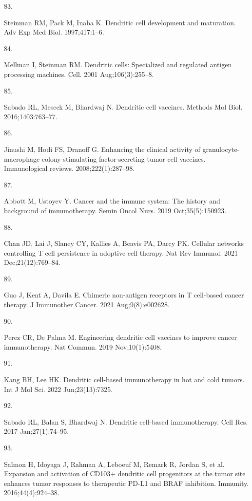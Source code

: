 \documentclass[
]{article}
\newlength{\cslhangindent}
\newlength{\csllabelwidth}
\newenvironment{CSLReferences}[2] %
 {\begin{list}{}{%
  \setlength{\itemindent}{0pt}
  \setlength{\leftmargin}{0pt}
  \setlength{\parsep}{0pt}
  \ifodd #1
   \setlength{\leftmargin}{\cslhangindent}
   \setlength{\itemindent}{-1\cslhangindent}
  \fi
  \setlength{\itemsep}{#2\baselineskip}}}
 {\end{list}}
\newcommand{\CSLLeftMargin}[1]{\parbox[t]{\csllabelwidth}{\strut#1\strut}}
\newcommand{\CSLRightInline}[1]{\parbox[t]{\linewidth - \csllabelwidth}{\strut#1\strut}}
\begin{document}
\begin{CSLReferences}{0}{1}
\CSLLeftMargin{83. }%
\CSLRightInline{Steinman RM, Pack M, Inaba K. Dendritic cell development
and maturation. Adv Exp Med Biol. 1997;417:1--6. }

\CSLLeftMargin{84. }%
\CSLRightInline{Mellman I, Steinman RM. Dendritic cells: Specialized and
regulated antigen processing machines. Cell. 2001 Aug;106(3):255--8. }

\CSLLeftMargin{85. }%
\CSLRightInline{Sabado RL, Meseck M, Bhardwaj N. Dendritic cell
vaccines. Methods Mol Biol. 2016;1403:763--77. }

\CSLLeftMargin{86. }%
\CSLRightInline{Jinushi M, Hodi FS, Dranoff G. Enhancing the clinical
activity of granulocyte-macrophage colony-stimulating factor-secreting
tumor cell vaccines. Immunological reviews. 2008;222(1):287--98. }

\CSLLeftMargin{87. }%
\CSLRightInline{Abbott M, Ustoyev Y. Cancer and the immune system: The
history and background of immunotherapy. Semin Oncol Nurs. 2019
Oct;35(5):150923. }

\CSLLeftMargin{88. }%
\CSLRightInline{Chan JD, Lai J, Slaney CY, Kallies A, Beavis PA, Darcy
PK. Cellular networks controlling {T} cell persistence in adoptive cell
therapy. Nat Rev Immunol. 2021 Dec;21(12):769--84. }

\CSLLeftMargin{89. }%
\CSLRightInline{Guo J, Kent A, Davila E. Chimeric non-antigen receptors
in {T} cell-based cancer therapy. J Immunother Cancer. 2021
Aug;9(8):e002628. }

\CSLLeftMargin{90. }%
\CSLRightInline{Perez CR, De Palma M. Engineering dendritic cell
vaccines to improve cancer immunotherapy. Nat Commun. 2019
Nov;10(1):5408. }

\CSLLeftMargin{91. }%
\CSLRightInline{Kang BH, Lee HK. Dendritic cell-based immunotherapy in
hot and cold tumors. Int J Mol Sci. 2022 Jun;23(13):7325. }

\CSLLeftMargin{92. }%
\CSLRightInline{Sabado RL, Balan S, Bhardwaj N. Dendritic cell-based
immunotherapy. Cell Res. 2017 Jan;27(1):74--95. }

\CSLLeftMargin{93. }%
\CSLRightInline{Salmon H, Idoyaga J, Rahman A, Leboeuf M, Remark R,
Jordan S, et al. Expansion and activation of CD103+ dendritic cell
progenitors at the tumor site enhances tumor responses to therapeutic
PD-L1 and BRAF inhibition. Immunity. 2016;44(4):924--38. }


\end{CSLReferences}
\end{document}
